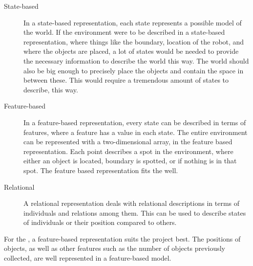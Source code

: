 \begin{description}
\item[State-based] In a state-based representation, each state represents a possible model of the world. If the environment were to be described in a state-based representation, where things like the boundary, location of the robot, and where the objects are placed, a lot of states would be needed to provide the necessary information to describe the world this way. The world should also be big enough to precisely place the objects and contain the space in between these. This would require a tremendous amount of states to describe, this way. 


\item[Feature-based] In a feature-based representation, every state can be described in terms of features, where a feature has a value in each state. The entire environment can be represented with a two-dimensional array, in the feature based representation. Each point describes a spot in the environment, where either an object is located, boundary is spotted, or if nothing is in that spot. The feature based representation fits the \projname{} well. 
\item[Relational] A relational representation deals with relational descriptions in terms of individuals and relations among them. This can be used to describe states of individuals or their position compared to others. 
\end{description}



For the \projname{}, a feature-based representation suits the project best. The positions of objects, as well as other features such as the number of objects previously collected, are well represented in a feature-based model. 










